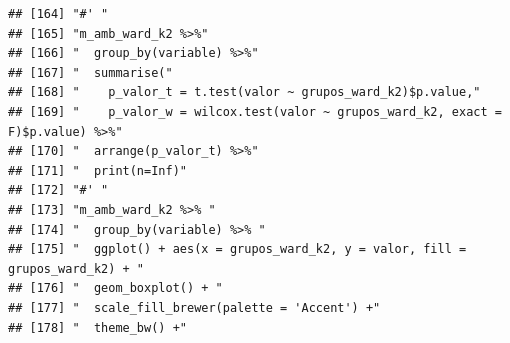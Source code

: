 \documentclass[11pt,]{article}
\begin{document}
\begin{verbatim}
## [164] "#' "                                                                                                                                                                   
## [165] "m_amb_ward_k2 %>%"                                                                                                                                                     
## [166] "  group_by(variable) %>%"                                                                                                                                              
## [167] "  summarise("                                                                                                                                                          
## [168] "    p_valor_t = t.test(valor ~ grupos_ward_k2)$p.value,"                                                                                                               
## [169] "    p_valor_w = wilcox.test(valor ~ grupos_ward_k2, exact = F)$p.value) %>%"                                                                                           
## [170] "  arrange(p_valor_t) %>%"                                                                                                                                              
## [171] "  print(n=Inf)"                                                                                                                                                        
## [172] "#' "                                                                                                                                                                   
## [173] "m_amb_ward_k2 %>% "                                                                                                                                                    
## [174] "  group_by(variable) %>% "                                                                                                                                             
## [175] "  ggplot() + aes(x = grupos_ward_k2, y = valor, fill = grupos_ward_k2) + "                                                                                             
## [176] "  geom_boxplot() + "                                                                                                                                                   
## [177] "  scale_fill_brewer(palette = 'Accent') +"                                                                                                                             
## [178] "  theme_bw() +"                                                                                                                                                        

\end{verbatim}
\end{document}
